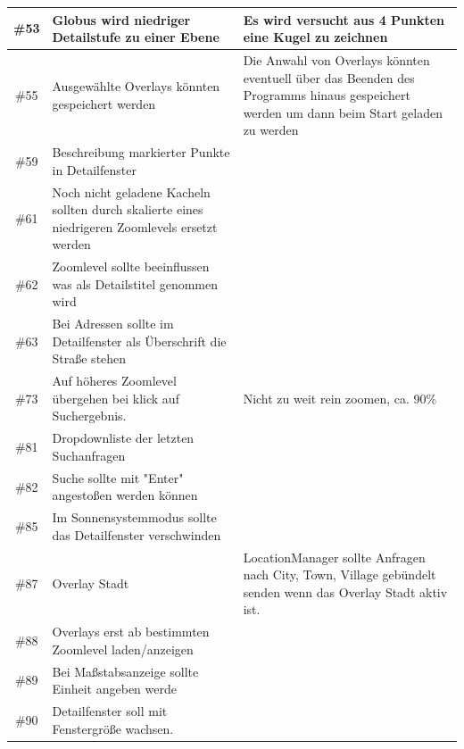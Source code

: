 \documentclass[10pt]{scrreprt}
\begin{document}
\begin{longtable}{|c|p{5.2cm}|p{8.2cm}|}
\hline
\#53 & Globus wird niedriger Detailstufe zu einer Ebene & Es wird versucht aus 4 Punkten eine Kugel zu zeichnen \\
\hline
\#55 & Ausgewählte Overlays könnten gespeichert werden & Die Anwahl von Overlays könnten eventuell über das Beenden des Programms hinaus gespeichert werden um dann beim Start geladen zu werden \\
\hline
\#59 & Beschreibung markierter Punkte in Detailfenster & \\
\hline
\#61 & Noch nicht geladene Kacheln sollten durch skalierte eines niedrigeren Zoomlevels ersetzt werden  & \\
\hline
\#62 & Zoomlevel sollte beeinflussen was als Detailstitel genommen wird & \\
\hline
\#63 & Bei Adressen sollte im Detailfenster als Überschrift die Straße stehen & \\
\hline
\#73 & Auf höheres Zoomlevel übergehen bei klick auf Suchergebnis. & Nicht zu weit rein zoomen, ca. 90\% \\
\hline
\#81 & Dropdownliste der letzten Suchanfragen & \\
\hline
\#82 & Suche sollte mit "Enter" angestoßen werden können & \\
\hline
\#85 & Im Sonnensystemmodus sollte das Detailfenster verschwinden & \\
\hline
\#87 & Overlay Stadt & LocationManager sollte Anfragen nach City, Town, Village gebündelt senden wenn das Overlay Stadt aktiv ist. \\
\hline
\#88 & Overlays erst ab bestimmten Zoomlevel laden/anzeigen & \\
\hline
\#89 & Bei Maßstabsanzeige sollte Einheit angeben werde & \\
\hline 
\#90 & Detailfenster soll mit Fenstergröße wachsen. & \\
\hline
\end{longtable}

\vspace{15mm}
\end{document}

